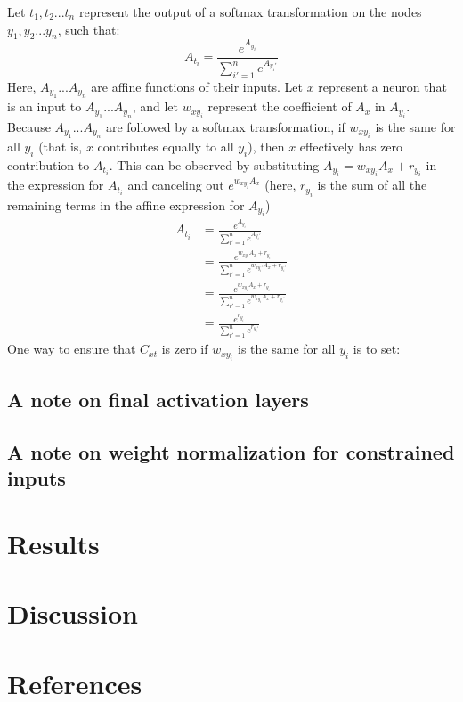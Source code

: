 \documentclass{article}
\begin{document}
Let ${t_1, t_2...t_n}$ represent the output of a softmax transformation on the nodes ${y_1, y_2...y_n}$, such that:
\begin{equation}
A_{t_i} = \frac{e^{A_{y_i}}}{\sum_{i' = 1}^n e^{A_{y_i'}}} 
\end{equation}
Here, $A_{y_1}...A_{y_n}$ are affine functions of their inputs. Let $x$ represent a neuron that is an input to $A_{y_1}...A_{y_n}$, and let $w_{xy_i}$ represent the coefficient of $A_x$ in $A_{y_i}$. Because $A_{y_1}...A_{y_n}$ are followed by a softmax transformation, if $w_{xy_i}$ is the same for all $y_i$ (that is, $x$ contributes equally to all $y_i$), then $x$ effectively has zero contribution to $A_{t_i}$. This can be observed by substituting $A_{y_i} = w_{xy_i}A_x + r_{y_i}$ in the expression for $A_{t_i}$ and canceling out $e^{w_{xy_i}A_x}$ (here, $r_{y_i}$ is the sum of all the remaining terms in the affine expression for $A_{y_i}$)
\begin{equation}
\begin{aligned}
A_{t_i} &= \frac{e^{A_{y_i}}}{\sum_{i' = 1}^n e^{A_{y_i'}}}\\
           &= \frac{e^{w_{xy_i}A_x + r_{y_i}}}{\sum_{i' = 1}^n e^{w_{xy_i'}A_x + r_{y_i'}}}\\
           &= \frac{e^{w_{xy_i}A_x + r_{y_i}}}{\sum_{i' = 1}^n e^{w_{xy_i}A_x + r_{y_i'}}}\\
           &= \frac{e^{r_{y_i}}}{\sum_{i' = 1}^n e^{r_{y_i'}}} 
\end{aligned}
\end{equation}
One way to ensure that $C_{xt}$ is zero if $w_{xy_i}$ is the same for all $y_i$ is to set:

\subsection{A note on final activation layers}

\subsection{A note on weight normalization for constrained inputs}

\section{Results}

\section{Discussion}

\section{References}
\end{document}
